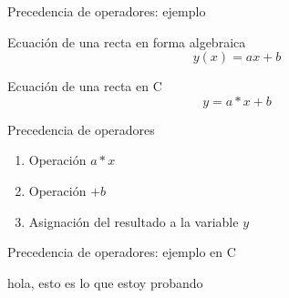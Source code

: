 \documentclass[xcolor=pdftex,table,11pt]{beamer}
\begin{document}
\begin{frame}{Precedencia de operadores: ejemplo}


 \begin{block}{Ecuación de una recta en forma algebraica}
\begin{equation}
y(x) = a x + b
\end{equation}
    \end{block}
    

 \begin{block}{Ecuación de una recta en C}
\begin{equation}
y = a * x + b
\end{equation}


  \end{block}

 \begin{block}{Precedencia de operadores}
 \begin{enumerate}
\item Operación $a * x$
\item Operación $+b$
\item Asignación del resultado a la variable $y$
\end{enumerate}
  \end{block}
\end{frame}
\begin{frame}{Precedencia de operadores: ejemplo en C}
\codesetstylefrombeamer
{}
\end{frame}

hola, esto es lo que estoy probando 
\end{document}
